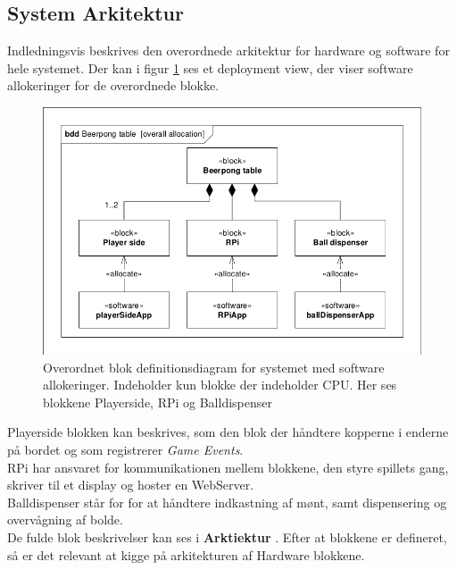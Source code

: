 \documentclass[Rapport/Rapport_main.tex]{subfiles}
\begin{document}
\subsection{System Arkitektur}
Indledningsvis beskrives den overordnede arkitektur for hardware og software for hele systemet. Der kan i figur \ref{fig:rap_systemarkitektur} ses et deployment view, der viser software allokeringer for de overordnede blokke.
\begin{figure}[H]
    \centering
    \includegraphics[width=1\textwidth,trim={0.24in 0.24in 0.24in 0.24in},clip, page=1]{Arkitektur/graphics/BDD_og_IBD.pdf}
    \caption{Overordnet blok definitionsdiagram for systemet med software allokeringer. Indeholder kun blokke der indeholder CPU. Her ses blokkene Playerside, RPi og Balldispenser}
    \label{fig:rap_systemarkitektur}
\end{figure}
Playerside blokken kan beskrives, som den blok der håndtere kopperne i enderne på bordet og som registrerer \textit{Game Events}.\\
RPi har ansvaret for kommunikationen mellem blokkene, den styre spillets gang, skriver til et display og hoster en WebServer. \\
Balldispenser står for for at håndtere indkastning af mønt, samt dispensering og overvågning af bolde.\\
De fulde blok beskrivelser kan ses i \textbf{Arktiektur} . Efter at blokkene er defineret, så er det relevant at kigge på arkitekturen af Hardware blokkene.
\end{document}
